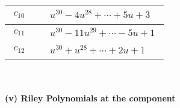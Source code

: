 \documentclass[1p]{elsarticle_modified}
\theoremstyle{definition}
\begin{document}
\begin{tabular}{m{50pt}|m{274pt}}
\hline $$\begin{aligned}c_{10}\end{aligned}$$&$\begin{aligned}
&u^{30}-4 u^{28}+\cdots+5 u+3
\end{aligned}$\\
\hline $$\begin{aligned}c_{11}\end{aligned}$$&$\begin{aligned}
&u^{30}-11 u^{29}+\cdots-5 u+1
\end{aligned}$\\
\hline $$\begin{aligned}c_{12}\end{aligned}$$&$\begin{aligned}
&u^{30}+u^{28}+\cdots+2 u+1
\end{aligned}$\\
\hline
\end{tabular}\\~\\
\newpage\renewcommand{\arraystretch}{1}
\flushleft \textbf{(v) Riley Polynomials at the component}\newline \\
\end{document}

